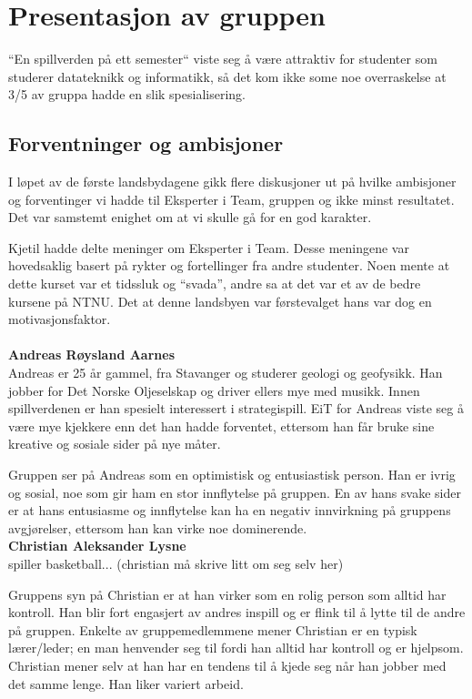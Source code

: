 \section{Presentasjon av gruppen}
``En spillverden på ett semester`` viste seg å være attraktiv for
studenter som studerer datateknikk og informatikk, så det kom ikke some
noe overraskelse at 3/5 av gruppa hadde en slik spesialisering.

\subsection{Forventninger og ambisjoner}
I løpet av de første landsbydagene gikk flere diskusjoner ut på hvilke
ambisjoner og forventinger vi hadde til Eksperter i Team, gruppen og
ikke minst resultatet. Det var samstemt enighet om at vi skulle gå for
en god karakter.

Kjetil hadde delte meninger om Eksperter i Team. Desse meningene var
hovedsaklig basert på rykter og fortellinger fra andre studenter. Noen
mente at dette kurset var et tidssluk og ``svada'', andre sa at det var
et av de bedre kursene på NTNU. Det at denne landsbyen var førstevalget
hans var dog en motivasjonsfaktor.
\\
\\
\textbf{Andreas Røysland Aarnes}\\
Andreas er 25 år gammel, fra Stavanger og studerer geologi og geofysikk. Han jobber for Det Norske Oljeselskap og driver ellers mye med musikk. Innen spillverdenen er han spesielt interessert i strategispill. EiT for Andreas viste seg å være mye kjekkere enn det han hadde forventet, ettersom han får bruke sine kreative og sosiale sider på nye måter. 

Gruppen ser på Andreas som en optimistisk og entusiastisk person. Han er ivrig og sosial, noe som gir ham en stor innflytelse på gruppen. En av hans svake sider er at hans entusiasme og innflytelse kan ha en negativ innvirkning på gruppens avgjørelser, ettersom han kan virke noe dominerende. \\


\textbf{Christian Aleksander Lysne}\\
spiller basketball... (christian må skrive litt om seg selv her)

Gruppens syn på Christian er at han virker som en rolig person som alltid har kontroll. Han blir fort engasjert av andres inspill og er flink til å lytte til de andre på gruppen. Enkelte av gruppemedlemmene mener Christian er en typisk lærer/leder; en man henvender seg til fordi han alltid har kontroll og er hjelpsom. Christian mener selv at han har en tendens til å kjede seg når han jobber med det samme lenge. Han liker variert arbeid. \\


